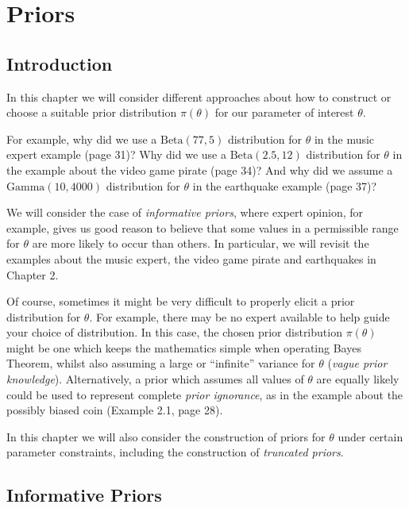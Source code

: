 \chapter{Priors}
\section{Introduction}
In this chapter we will consider different approaches about how to construct or choose a suitable prior distribution $\pi(\theta)$ for our parameter of interest $\theta$.  

For example, why did we use a $\text{Beta}(77,5)$ distribution for $\theta$ in the music expert example (page 31)?  Why did we use a $\text{Beta}(2.5,12)$ distribution for $\theta$ in the example about the video game pirate (page 34)?  And why did we assume a $\text{Gamma}(10,4000)$ distribution for $\theta$ in the earthquake example (page 37)?


We will consider the case of \textit{informative priors}, where expert opinion, for example, gives us good reason to believe that some values in a permissible range for $\theta$ are more likely to occur than others.  In particular, we will revisit the examples about the music expert, the video game pirate and earthquakes in Chapter 2.  

Of course, sometimes it might be very difficult to properly elicit a prior distribution for $\theta$.  For example, there may be no expert available to help guide your choice of distribution.  In this case, the chosen prior distribution $\pi(\theta)$ might be one which keeps the mathematics simple when operating Bayes Theorem, whilst also assuming a large or ``infinite'' variance for $\theta$ (\textit{vague prior knowledge}).  Alternatively, a prior which assumes all values of $\theta$ are equally likely could be used to represent complete \textit{prior ignorance}, as in the example about the possibly biased coin (Example 2.1, page 28).   

In this chapter we will also consider the construction of priors for $\theta$ under certain parameter constraints, including the construction of \textit{truncated priors}.    


\newpage

\section{Informative Priors}

